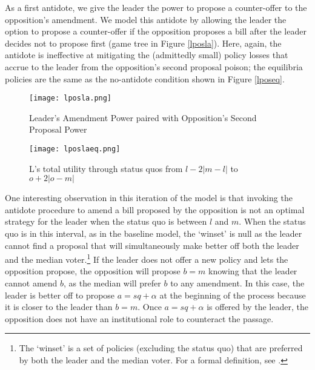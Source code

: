 \documentclass[12pt]{article}
\theoremstyle{plain}		      \newtheorem{assn}{Assumption}
\theoremstyle{plain}		      \newtheorem{prop}{Proposition}
\theoremstyle{plain}		      \newtheorem{lemma}{Lemma}
\theoremstyle{plain}	          \newtheorem{imp}{Implication}
\theoremstyle{plain}	          \newtheorem{hyp}{Hypothesis}
\theoremstyle{definition}		  \newtheorem{defn}{Definition}
\theoremstyle{remark}	          \newtheorem{rem}{Remark}
\theoremstyle{definition}         \newtheorem{case}{Case}
\begin{document}
\indent As a first antidote, we give the leader the power to propose a counter-offer to the opposition's amendment. We model this antidote by allowing the leader the option to propose a counter-offer if the opposition proposes a bill after the leader decides not to propose first (game tree in Figure \ref{lposla}). Here, again, the antidote is ineffective at mitigating the (admittedly small) policy losses that accrue to the leader from the opposition's second proposal poison; the equilibria policies are the same as the no-antidote condition shown in Figure \ref{lposeq}. 
\begin{figure}[h]
  \centering
  \begin{minipage}[b]{0.3\textwidth}
    \texttt{[image: lposla.png]}
    \caption{Leader's Amendment Power paired with Opposition's Second Proposal Power}
    \label{lposla}
  \end{minipage}
  \hfill
  \begin{minipage}[b]{0.6\textwidth}
    \texttt{[image: lposlaeq.png]}
    \caption{L's total utility through status quos \newline from $l-2|m-l|$ to $o+2|o-m|$}
    \label{lposlaeq}
  \end{minipage}
\end{figure}
\FloatBarrier
\indent One interesting observation in this iteration of the model is that invoking the antidote procedure to amend a bill proposed by the opposition is not an optimal strategy for the leader when the status quo is between $l$ and $m$. When the status quo is in this interval, as in the baseline model, the `winset' is null as the leader cannot find a proposal that will simultaneously make better off both the leader and the median voter.\footnote{The `winset' is a set of policies (excluding the status quo) that are preferred by both the leader and the median voter. For a formal definition, see \citet{tsebelis02}.} If the leader does not offer a new policy and lets the opposition propose, the opposition will propose $b=m$ knowing that the leader cannot amend $b$, as the median will prefer $b$ to any amendment. In this case, the leader is better off to propose $a=sq+\alpha$ at the beginning of the process because it is closer to the leader than $b=m$. Once $a=sq+\alpha$ is offered by the leader, the opposition does not have an institutional role to counteract the passage. 
\end{document}
